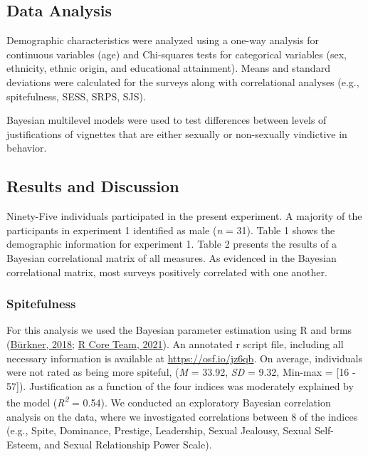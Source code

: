 \documentclass[
  donotrepeattitle,doc, 12pt, a4paper,floatsintext]{apa7}
\begin{document}
\hypertarget{data-analysis}{%
\subsection{Data Analysis}\label{data-analysis}}

Demographic characteristics were analyzed using a one-way analysis for continuous variables (age) and Chi-squares tests for categorical variables (sex, ethnicity, ethnic origin, and educational attainment). Means and standard deviations were calculated for the surveys along with correlational analyses (e.g., spitefulness, SESS, SRPS, SJS).

Bayesian multilevel models were used to test differences between levels of justifications of vignettes that are either sexually or non-sexually vindictive in behavior.

\hypertarget{results-and-discussion}{%
\subsection{Results and Discussion}\label{results-and-discussion}}

Ninety-Five individuals participated in the present experiment. A majority of the participants in experiment 1 identified as male (\emph{n} = 31). Table 1 shows the demographic information for experiment 1. Table 2 presents the results of a Bayesian correlational matrix of all measures. As evidenced in the Bayesian correlational matrix, most surveys positively correlated with one another.

\hypertarget{spitefulness}{%
\subsubsection{Spitefulness}\label{spitefulness}}

For this analysis we used the Bayesian parameter estimation using R and brms (\protect\hyperlink{ref-burkner2018}{Bürkner, 2018}; \protect\hyperlink{ref-rcoreteam2021}{R Core Team, 2021}). An annotated r script file, including all necessary information is available at \url{https://osf.io/jz6qb}. On average, individuals were not rated as being more spiteful, (\emph{M} = 33.92, \emph{SD} = 9.32, Min-max = {[}16 - 57{]}). Justification as a function of the four indices was moderately explained by the model (\emph{R\textsuperscript{2}} = 0.54). We conducted an exploratory Bayesian correlation analysis on the data, where we investigated correlations between 8 of the indices (e.g., Spite, Dominance, Prestige, Leadership, Sexual Jealousy, Sexual Self-Esteem, and Sexual Relationship Power Scale).
\end{document}

